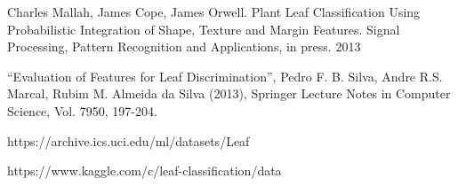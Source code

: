 \documentclass{article}
\begin{document}
\begin{thebibliography}{9}
Charles Mallah, James Cope, James Orwell. Plant Leaf Classification Using Probabilistic Integration of Shape, Texture and Margin Features. Signal Processing, Pattern Recognition and Applications, in press. 2013

“Evaluation of Features for Leaf Discrimination”, Pedro F. B. Silva, Andre R.S. Marcal, Rubim M. Almeida da Silva (2013), Springer Lecture Notes in Computer Science, Vol. 7950, 197-204.

https://archive.ics.uci.edu/ml/datasets/Leaf

https://www.kaggle.com/c/leaf-classification/data

\end{thebibliography}
\end{document}

